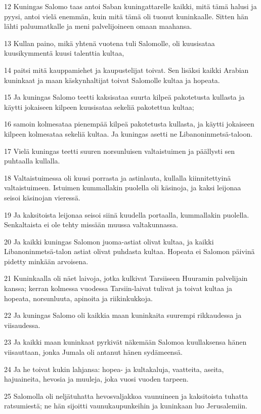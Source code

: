 \par 12 Kuningas Salomo taas antoi Saban kuningattarelle kaikki, mitä tämä halusi ja pyysi, antoi vielä enemmän, kuin mitä tämä oli tuonut kuninkaalle. Sitten hän lähti paluumatkalle ja meni palvelijoineen omaan maahansa.
\par 13 Kullan paino, mikä yhtenä vuotena tuli Salomolle, oli kuusisataa kuusikymmentä kuusi talenttia kultaa,
\par 14 paitsi mitä kauppamiehet ja kaupustelijat toivat. Sen lisäksi kaikki Arabian kuninkaat ja maan käskynhaltijat toivat Salomolle kultaa ja hopeata.
\par 15 Ja kuningas Salomo teetti kaksisataa suurta kilpeä pakotetusta kullasta ja käytti jokaiseen kilpeen kuusisataa sekeliä pakotettua kultaa;
\par 16 samoin kolmesataa pienempää kilpeä pakotetusta kullasta, ja käytti jokaiseen kilpeen kolmesataa sekeliä kultaa. Ja kuningas asetti ne Libanoninmetsä-taloon.
\par 17 Vielä kuningas teetti suuren norsunluisen valtaistuimen ja päällysti sen puhtaalla kullalla.
\par 18 Valtaistuimessa oli kuusi porrasta ja astinlauta, kullalla kiinnitettyinä valtaistuimeen. Istuimen kummallakin puolella oli käsinoja, ja kaksi leijonaa seisoi käsinojan vieressä.
\par 19 Ja kaksitoista leijonaa seisoi siinä kuudella portaalla, kummallakin puolella. Senkaltaista ei ole tehty missään muussa valtakunnassa.
\par 20 Ja kaikki kuningas Salomon juoma-astiat olivat kultaa, ja kaikki Libanoninmetsä-talon astiat olivat puhdasta kultaa. Hopeata ei Salomon päivinä pidetty minkään arvoisena.
\par 21 Kuninkaalla oli näet laivoja, jotka kulkivat Tarsiiseen Huuramin palvelijain kanssa; kerran kolmessa vuodessa Tarsiin-laivat tulivat ja toivat kultaa ja hopeata, norsunluuta, apinoita ja riikinkukkoja.
\par 22 Ja kuningas Salomo oli kaikkia maan kuninkaita suurempi rikkaudessa ja viisaudessa.
\par 23 Ja kaikki maan kuninkaat pyrkivät näkemään Salomoa kuullaksensa hänen viisauttaan, jonka Jumala oli antanut hänen sydämeensä.
\par 24 Ja he toivat kukin lahjansa: hopea- ja kultakaluja, vaatteita, aseita, hajuaineita, hevosia ja muuleja, joka vuosi vuoden tarpeen.
\par 25 Salomolla oli neljätuhatta hevosvaljakkoa vaunuineen ja kaksitoista tuhatta ratsumiestä; ne hän sijoitti vaunukaupunkeihin ja kuninkaan luo Jerusalemiin.
